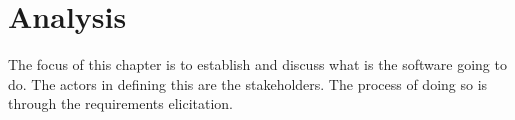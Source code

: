 \chapter{Analysis}
The focus of this chapter is to establish and discuss what is the software going to do. The actors in defining this are the stakeholders. The process of doing so is through the requirements elicitation. 

